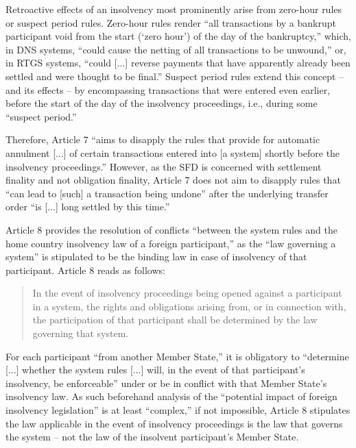 Retroactive effects of an insolvency most prominently arise from zero-hour rules or suspect period rules.
Zero-hour rules render ``all transactions by a bankrupt participant void from the start (`zero hour') of the day of the bankruptcy,'' which, in DNS systems, ``could cause the netting of all transactions to be unwound,'' or, in RTGS systems, ``could [...] reverse payments that have apparently already been settled and were thought to be final.'' \autocite[19]{cpmi2001}
Suspect period rules extend this concept -- and its effects -- by encompassing transactions that were entered even earlier, before the start of the day of the insolvency proceedings, i.e., during some ``suspect period.'' \autocite[57]{vereecken2003}

Therefore, Article 7 ``aims to disapply the rules that provide for automatic annulment [...] of certain transactions entered into [a system] shortly before the insolvency proceedings.'' \autocite[57]{vereecken2003}
However, as the SFD is concerned with settlement finality and not obligation finality, Article 7 does not aim to disapply rules that ``can lead to [such] a transaction being undone'' after the underlying transfer order ``is [...] long settled by this time.'' \autocite[57]{vereecken2003}

Article 8 provides the resolution of conflicts ``between the system rules and the home country insolvency law of a foreign participant,'' as the ``law governing a system'' is stipulated to be the binding law in case of insolvency of that participant. \autocite[19]{cpmi2001}
Article 8 reads as follows: \autocite{eu1998sfd}

\begin{quote}
	In the event of insolvency proceedings being opened against a participant in a system, the rights and obligations arising from, or in connection with, the participation of that participant shall be determined by the law governing that system.
\end{quote}

For each participant ``from another Member State,'' it is obligatory to ``determine [...] whether the system rules [...] will, in the event of that participant's insolvency, be enforceable'' under or be in conflict with that Member State's insolvency law. \autocite[58]{vereecken2003}
As such beforehand analysis of the ``potential impact of foreign insolvency legislation'' is at least ``complex,'' if not impossible, \autocite[58]{vereecken2003} Article 8 stipulates the law applicable in the event of insolvency proceedings is the law that governs the system -- not the law of the insolvent participant's Member State.

